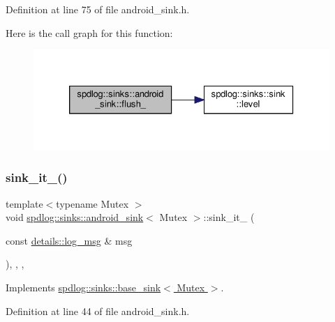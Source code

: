 Definition at line 75 of file android\+\_\+sink.\+h.

Here is the call graph for this function\+:
\nopagebreak
\begin{figure}[H]
\begin{center}
\leavevmode
\includegraphics[width=326pt]{classspdlog_1_1sinks_1_1android__sink_ac71785899fb01c7b0328b66b3727e2c3_cgraph}
\end{center}
\end{figure}
\mbox{\label{classspdlog_1_1sinks_1_1android__sink_ab91c7aabd013d009ff811e6d34324128}} 
\subsubsection{\texorpdfstring{sink\+\_\+it\+\_\+()}{sink\_it\_()}}
{\footnotesize\ttfamily template$<$typename Mutex $>$ \\
void \hyperlink{classspdlog_1_1sinks_1_1android__sink}{spdlog\+::sinks\+::android\+\_\+sink}$<$ Mutex $>$\+::sink\+\_\+it\+\_\+ (\begin{DoxyParamCaption}\item[{const \hyperlink{structspdlog_1_1details_1_1log__msg}{details\+::log\+\_\+msg} \&}]{msg }\end{DoxyParamCaption})\hspace{0.3cm}{\ttfamily [inline]}, {\ttfamily [override]}, {\ttfamily [protected]}, {\ttfamily [virtual]}}



Implements \hyperlink{classspdlog_1_1sinks_1_1base__sink_ad698d300cb7f5e58b2aa1b9907cdbd87}{spdlog\+::sinks\+::base\+\_\+sink$<$ Mutex $>$}.



Definition at line 44 of file android\+\_\+sink.\+h.


